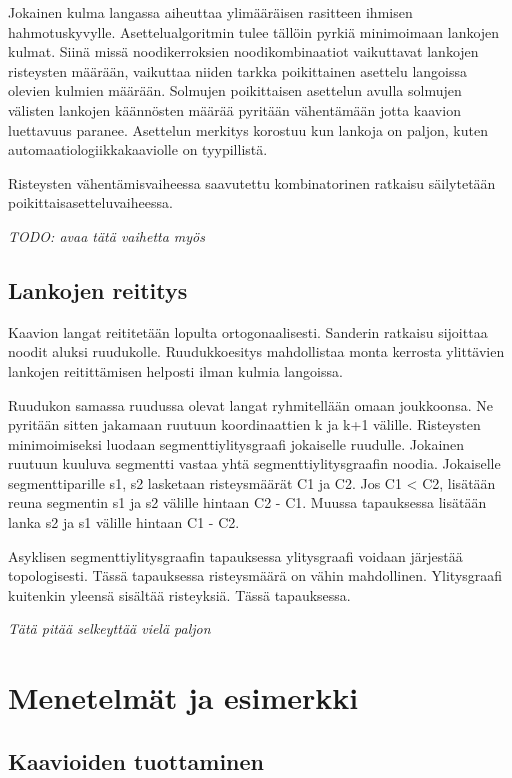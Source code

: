 \documentclass[finnish,12pt]{article}
\begin{document}
Jokainen kulma langassa aiheuttaa ylimääräisen rasitteen ihmisen hahmotuskyvylle. \cite{RefWorks:47}
Asettelualgoritmin tulee tällöin pyrkiä minimoimaan lankojen kulmat.
Siinä missä noodikerroksien noodikombinaatiot vaikuttavat lankojen risteysten määrään, vaikuttaa niiden tarkka poikittainen asettelu langoissa olevien kulmien määrään.
Solmujen poikittaisen asettelun avulla solmujen välisten lankojen käännösten määrää pyritään vähentämään jotta kaavion luettavuus paranee.
Asettelun merkitys korostuu kun lankoja on paljon, kuten automaatiologiikkakaaviolle on tyypillistä.

Risteysten vähentämisvaiheessa saavutettu kombinatorinen ratkaisu säilytetään poikittaisasetteluvaiheessa.

\emph{TODO: avaa tätä vaihetta myös}

		\subsection{Lankojen reititys}


Kaavion langat reititetään lopulta ortogonaalisesti.
Sanderin ratkaisu sijoittaa noodit aluksi ruudukolle.
Ruudukkoesitys mahdollistaa monta kerrosta ylittävien lankojen reitittämisen helposti ilman kulmia langoissa.

Ruudukon samassa ruudussa olevat langat ryhmitellään omaan joukkoonsa.
Ne pyritään sitten jakamaan ruutuun koordinaattien k ja k+1 välille.
Risteysten minimoimiseksi luodaan segmenttiylitysgraafi jokaiselle ruudulle. Jokainen ruutuun kuuluva segmentti vastaa yhtä segmenttiylitysgraafin noodia. Jokaiselle segmenttiparille s1, s2 lasketaan risteysmäärät C1 ja C2. Jos C1 < C2, lisätään reuna segmentin s1 ja s2 välille hintaan C2 - C1. Muussa tapauksessa lisätään lanka s2 ja s1 välille hintaan C1 - C2.

Asyklisen segmenttiylitysgraafin tapauksessa ylitysgraafi voidaan järjestää topologisesti. Tässä tapauksessa risteysmäärä on vähin mahdollinen. Ylitysgraafi kuitenkin yleensä sisältää risteyksiä. Tässä tapauksessa.\cite{RefWorks:17}

\emph{Tätä pitää selkeyttää vielä paljon}


	\clearpage
	\section{Menetelmät ja esimerkki}

		\subsection{Kaavioiden tuottaminen}
\end{document}
